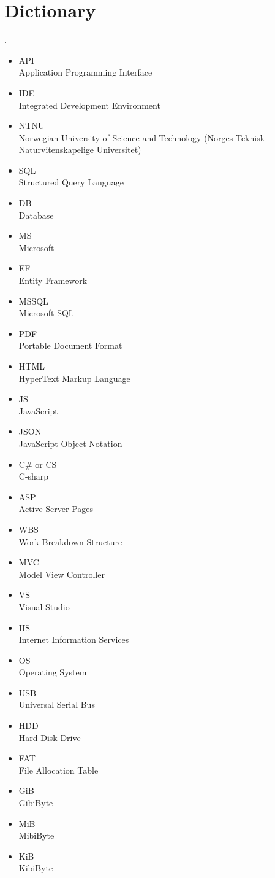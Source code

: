 \section{Dictionary}.
\begin{itemize}
\item API \\ Application Programming Interface
\item IDE \\ Integrated Development Environment
\item NTNU \\ Norwegian University of Science and Technology (Norges Teknisk - Naturvitenskapelige Universitet)
\item SQL \\ Structured Query Language 
\item DB \\ Database 
\item MS \\ Microsoft
\item EF \\ Entity Framework
\item MSSQL \\ Microsoft SQL
\item PDF \\ Portable Document Format
\item HTML \\ HyperText Markup Language
\item JS \\ JavaScript
\item JSON \\ JavaScript Object Notation
\item C\# or CS\\ C-sharp
\item ASP \\ Active Server Pages
\item WBS \\ Work Breakdown Structure
\item MVC \\ Model View Controller
\item VS \\ Visual Studio
\item IIS \\Internet Information Services
\item OS \\ Operating System
\item USB \\ Universal Serial Bus
\item HDD \\ Hard Disk Drive
\item FAT \\ File Allocation Table
\item GiB \\ GibiByte
\item MiB \\ MibiByte
\item KiB \\ KibiByte
\end{itemize}




